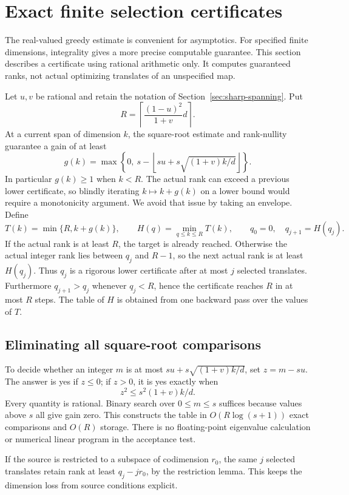 \section{Exact finite selection certificates}

The real-valued greedy estimate is convenient for asymptotics. For
specified finite dimensions, integrality gives a more precise computable
guarantee. This section describes a certificate using rational arithmetic
only. It computes guaranteed ranks, not actual optimizing translates of an
unspecified map.

Let $u,v$ be rational and retain the notation of
Section~\ref{sec:sharp-spanning}. Put
\[
 R=\left\lceil\frac{(1-u)^2}{1+v}d\right\rceil.
\]
At a current span of dimension $k$, the square-root estimate and
rank-nullity guarantee a gain of at least
\[
 g(k)=\max\left\{0,\ s-\left\lfloor
 su+s\sqrt{(1+v)k/d}\right\rfloor\right\}.
\]
In particular $g(k)\ge1$ when $k<R$. The actual rank can exceed a
previous lower certificate, so blindly iterating $k\mapsto k+g(k)$ on a
lower bound would require a monotonicity argument. We avoid that issue by
taking an envelope. Define
\[
 T(k)=\min\{R,k+g(k)\},\qquad
 H(q)=\min_{q\le k\le R}T(k),\qquad
 q_0=0,\quad q_{j+1}=H(q_j).
\]
If the actual rank is at least $R$, the target is already reached.
Otherwise the actual integer rank lies between $q_j$ and $R-1$, so the
next actual rank is at least $H(q_j)$. Thus $q_j$ is a rigorous lower
certificate after at most $j$ selected translates. Furthermore
$q_{j+1}>q_j$ whenever $q_j<R$, hence the certificate reaches $R$ in at
most $R$ steps. The table of $H$ is obtained from one backward pass over
the values of $T$.

\subsection{Eliminating all square-root comparisons}

To decide whether an integer $m$ is at most
$su+s\sqrt{(1+v)k/d}$, set $z=m-su$. The answer is yes if $z\le0$;
if $z>0$, it is yes exactly when
\[
 z^2\le s^2(1+v)k/d.
\]
Every quantity is rational. Binary search over $0\le m\le s$ suffices
because values above $s$ all give gain zero. This constructs the table in
$O(R\log(s+1))$ exact comparisons and $O(R)$ storage. There is no
floating-point eigenvalue calculation or numerical linear program in the
acceptance test.

If the source is restricted to a subspace of codimension $r_0$, the same
$j$ selected translates retain rank at least $q_j-jr_0$, by the restriction
lemma. This keeps the dimension loss from source conditions explicit.

